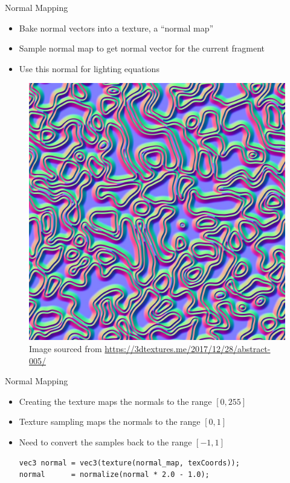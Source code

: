 \documentclass{beamer}
\begin{document}
\begin{frame}[fragile]{Normal Mapping}
    \begin{itemize}
        \item Bake normal vectors into a texture, a ``normal map''
        \item Sample normal map to get normal vector for the current fragment
        \item Use this normal for lighting equations
    \end{itemize}

    \begin{figure}
        \centering
        \includegraphics[height=0.50\textheight]{images/Abstract_005_NORM.jpg}
        \caption{\footnotesize{Image sourced from \url{https://3dtextures.me/2017/12/28/abstract-005/}}}
    \end{figure}
\end{frame}

\begin{frame}[fragile]{Normal Mapping}
    \begin{itemize}
        \item Creating the texture maps the normals to the range $\left[0, 255\right]$
        \item Texture sampling maps the normals to the range $\left[0, 1\right]$
        \item Need to convert the samples back to the range $\left[-1, 1\right]$
              \footnotesize{
                  \begin{verbatim}
vec3 normal = vec3(texture(normal_map, texCoords));
normal      = normalize(normal * 2.0 - 1.0);
\end{verbatim}
              }
    \end{itemize}
\end{frame}
\end{document}
